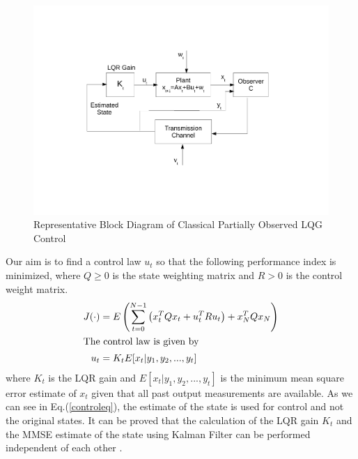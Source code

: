 \documentclass[a4paper,12pt]{article}
\begin{document}
	\begin{figure}[H]

			  \centering
%			  
			\includegraphics[scale=0.5]{lqg_block}
			  \caption{Representative Block Diagram of Classical Partially Observed LQG Control}
			 \label{lqg}
		\end{figure}	
	
	Our aim is to find a control law $u_{t}$ so that the following performance index is minimized, where $Q \geq 0$ is the state weighting matrix and $R > 0$ is the control weight matrix. 
	\begin{align}
		J(\cdot)&=E\left(\sum\limits_{t=0}^{N-1} \left(x_{t}^{T}Qx_{t} + u_{t}^{T}Ru_{t}\right) + x_{N}^{T}Qx_{N} \right)\\
	\intertext{The control law is given by}
	\label{controleq}
	u_{t}&=K_{t}E[x_{t}|y_{1},y_{2},...,y_{t}]
	\end{align}
	 where $K_{t}$ is the LQR gain and $E[x_{t}|y_{1},y_{2},...,y_{t}]$ is the minimum mean square error estimate of $x_{t}$ given that all past output measurements are available. As we can see in Eq.(\ref{controleq}), the estimate of the state is used for control and not the original states. It can be proved that the calculation of the LQR gain $K_{t}$ and the MMSE estimate of the state using Kalman Filter can be performed independent of each other \cite{book}. 
\end{document}
